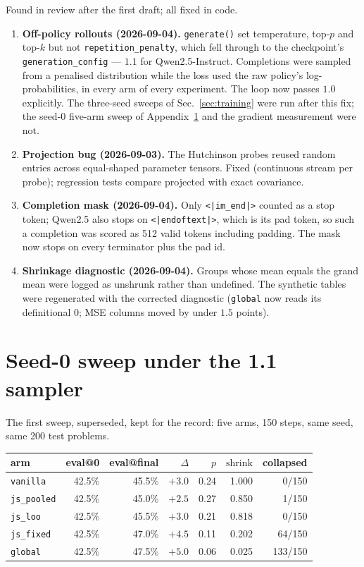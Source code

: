 \documentclass{article}
\newcommand{\shrink}{\mathrm{shrink}}
\newcommand{\arm}[1]{\texttt{#1}}
\begin{document}
Found in review after the first draft; all fixed in code.
\begin{enumerate}\itemsep2pt
\item \textbf{Off-policy rollouts (2026-09-04).} \texttt{generate()} set
      temperature, top-$p$ and top-$k$ but not
      \texttt{repetition\_penalty}, which fell through to the checkpoint's
      \texttt{generation\_config} --- $1.1$ for Qwen2.5-Instruct.
      Completions were sampled from a penalised distribution while the loss
      used the raw policy's log-probabilities, in every arm of every
      experiment. The loop now passes $1.0$ explicitly. The three-seed
      sweeps of Sec.~\ref{sec:training} were run after this fix; the
      seed-0 five-arm sweep of Appendix~\ref{app:seed0} and the gradient
      measurement were not.
\item \textbf{Projection bug (2026-09-03).} The Hutchinson probes reused
      random entries across equal-shaped parameter tensors. Fixed
      (continuous stream per probe); regression tests compare projected
      with exact covariance.
\item \textbf{Completion mask (2026-09-04).} Only \texttt{<|im\_end|>}
      counted as a stop token; Qwen2.5 also stops on
      \texttt{<|endoftext|>}, which is its pad token, so such a completion
      was scored as 512 valid tokens including padding. The mask now stops
      on every terminator plus the pad id.
\item \textbf{Shrinkage diagnostic (2026-09-04).} Groups whose mean equals
      the grand mean were logged as unshrunk rather than undefined. The
      synthetic tables were regenerated with the corrected diagnostic
      (\arm{global} now reads its definitional $0$; MSE columns moved by
      under $1.5$ points).
\end{enumerate}

\section{Seed-0 sweep under the 1.1 sampler}
\label{app:seed0}

The first sweep, superseded, kept for the record: five arms, 150 steps,
same seed, same 200 test problems.

\begin{center}\small
\begin{tabular}{lrrrrrr}
\toprule
arm & eval@0 & eval@final & $\Delta$ & $p$ & $\shrink$ & collapsed \\
\midrule
\arm{vanilla}    & 42.5\% & 45.5\% & $+3.0$ & 0.24 & 1.000 & 0/150 \\
\arm{js\_pooled} & 42.5\% & 45.0\% & $+2.5$ & 0.27 & 0.850 & 1/150 \\
\arm{js\_loo}    & 42.5\% & 45.5\% & $+3.0$ & 0.21 & 0.818 & 0/150 \\
\arm{js\_fixed}  & 42.5\% & 47.0\% & $+4.5$ & 0.11 & 0.202 & 64/150 \\
\arm{global}     & 42.5\% & 47.5\% & $+5.0$ & 0.06 & 0.025 & 133/150 \\
\bottomrule
\end{tabular}
\end{center}
\end{document}
